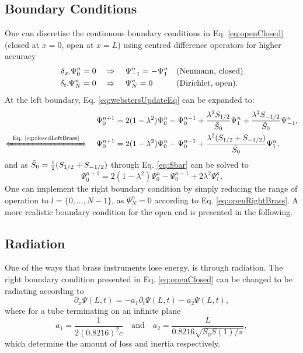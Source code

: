\subsection{Boundary Conditions}
One can discretise the continuous boundary conditions in Eq. \eqref{eq:openClosed} (closed at $x=0$, open at $x=L$) using centred difference operators for higher accuracy
\begin{subequations}\label{eq:discBoundariesBrass}
    \begin{align}
        \dxd\Psi_0^n &= 0 \quad \Rightarrow \quad\Psi_{-1}^n = -\Psi_1^n \quad \!\!\!\!\!\!&&\text{(Neumann, closed)} \label{eq:closedLeftBrass}\\
        \dtd\Psi_N^n &= 0\quad\Rightarrow \quad \Psi_N^n = 0 \quad \!\!\!\!\!\!&&\text{(Dirichlet, open)}\label{eq:openRightBrass}.
    \end{align}
\end{subequations} 
At the left boundary, Eq. \eqref{eq:webstersUpdateEq} can be expanded to:
\begin{equation*}
    \begin{aligned}
        \Psi_0^{n+1} &= 2(1-\lambda^2)\Psi_0^n-\Psi_0^{n-1}+ \frac{\lambda^2S_{1/2}}{\bar S_0}\Psi_1^n + \frac{\lambda^2S_{-1/2}}{\bar S_0}\Psi_{-1}^n,\\[-0.5em]
        \xLeftrightarrow{\mystrut\ \text{Eq. \eqref{eq:closedLeftBrass}}\ }\quad\Psi_0^{n+1} &= 2(1-\lambda^2)\Psi_0^n-\Psi_0^{n-1}+ \frac{\lambda^2(S_{1/2}+S_{-1/2})}{\bar S_0}\Psi_1^n,
    \end{aligned}
\end{equation*}
and as $\bar{S}_0 = \frac{1}{2}(S_{1/2}+S_{-1/2})$ through Eq. \eqref{eq:Sbar} can be solved to
\begin{equation}\label{eq:leftBoundaryWebster}
    \Psi_0^{n+1} = 2(1-\lambda^2)\Psi_0^n-\Psi_0^{n-1}+ 2\lambda^2\Psi_1^n.
\end{equation}
One can implement the right boundary condition by simply reducing the range of operation to $l = \{0, \hdots, N-1\}$, as $\Psi_N^n = 0$ according to Eq. \eqref{eq:openRightBrass}. A more realistic boundary condition for the open end is presented in the following.

\subsection{Radiation}\label{sec:radiating}
One of the ways that brass instruments lose energy, is through radiation. The right boundary condition presented in Eq. \eqref{eq:openClosed} can be changed to be radiating according to \cite{theBible}
\begin{equation}\label{eq:radCont}
    \partial_x\Psi(L,t) = -a_1\partial_t\Psi(L,t)-a_2\Psi(L,t),
\end{equation}
where for a tube terminating on an infinite plane \cite{Atig2004}
\begin{equation}
    a_1 = \frac{1}{2(0.8216)^2c} \quad \text{and} \quad a_2 = \frac{L}{0.8216\sqrt{S_0S(1)/\pi}},
\end{equation}
which determine the amount of loss and inertia respectively. 

